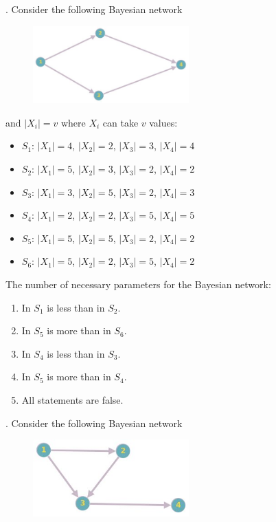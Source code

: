 . Consider the following Bayesian network

\begin{figure}[h]
    \centering
    \includegraphics[width=6cm]{Images/directed-exercise.jpg}
    \label{fig:exercise-bayesian}
\end{figure}

\noindent and $|{X_i}| = v$ where $X_i$ can take $v$ values:

\begin{itemize}
    \item $S_1$: $|X_1| = 4$, $|X_2| = 2$, $|X_3| = 3$, $|X_4| = 4$
    \item $S_2$: $|X_1| = 5$, $|X_2| = 3$, $|X_3| = 2$, $|X_4| = 2$
    \item $S_3$: $|X_1| = 3$, $|X_2| = 5$, $|X_3| = 2$, $|X_4| = 3$
    \item $S_4$: $|X_1| = 2$, $|X_2| = 2$, $|X_3| = 5$, $|X_4| = 5$
    \item $S_5$: $|X_1| = 5$, $|X_2| = 5$, $|X_3| = 2$, $|X_4| = 2$
    \item $S_6$: $|X_1| = 5$, $|X_2| = 2$, $|X_3| = 5$, $|X_4| = 2$
\end{itemize}

\noindent The number of necessary parameters for the Bayesian network:

\begin{enumerate}[label=\roman*]
    \item In $S_1$ is less than in $S_2$.
    \item In $S_5$ is more than in $S_6$.
    \item In $S_4$ is less than in $S_3$.
    \item In $S_5$ is more than in $S_4$.
    \item All statements are false.
\end{enumerate}


. Consider the following Bayesian network

\begin{figure}[h]
    \centering
    \includegraphics[width=6cm]{Images/directed-exercise2.jpg}
    \label{fig:exercise-bayesian}
\end{figure}

